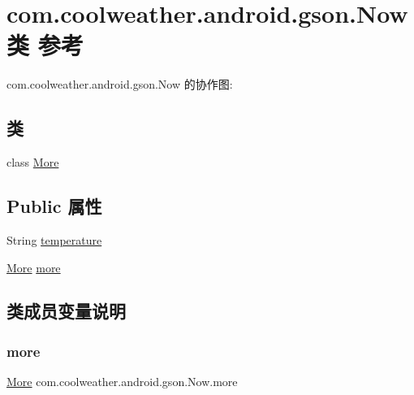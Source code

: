\hypertarget{classcom_1_1coolweather_1_1android_1_1gson_1_1_now}{}\section{com.\+coolweather.\+android.\+gson.\+Now类 参考}
\label{classcom_1_1coolweather_1_1android_1_1gson_1_1_now}


com.\+coolweather.\+android.\+gson.\+Now 的协作图\+:
\subsection*{类}
\begin{DoxyCompactItemize}
\item 
class \mbox{\hyperlink{classcom_1_1coolweather_1_1android_1_1gson_1_1_now_1_1_more}{More}}
\end{DoxyCompactItemize}
\subsection*{Public 属性}
\begin{DoxyCompactItemize}
\item 
String \mbox{\hyperlink{classcom_1_1coolweather_1_1android_1_1gson_1_1_now_a6cb643a0e50bd3e4d7c673404e55cc1a}{temperature}}
\item 
\mbox{\hyperlink{classcom_1_1coolweather_1_1android_1_1gson_1_1_now_1_1_more}{More}} \mbox{\hyperlink{classcom_1_1coolweather_1_1android_1_1gson_1_1_now_a980a314a5344be64af36f9e72e2c3542}{more}}
\end{DoxyCompactItemize}


\subsection{类成员变量说明}
\mbox{\label{classcom_1_1coolweather_1_1android_1_1gson_1_1_now_a980a314a5344be64af36f9e72e2c3542}} 
\subsubsection{\texorpdfstring{more}{more}}
{\footnotesize\ttfamily \mbox{\hyperlink{classcom_1_1coolweather_1_1android_1_1gson_1_1_now_1_1_more}{More}} com.\+coolweather.\+android.\+gson.\+Now.\+more}

